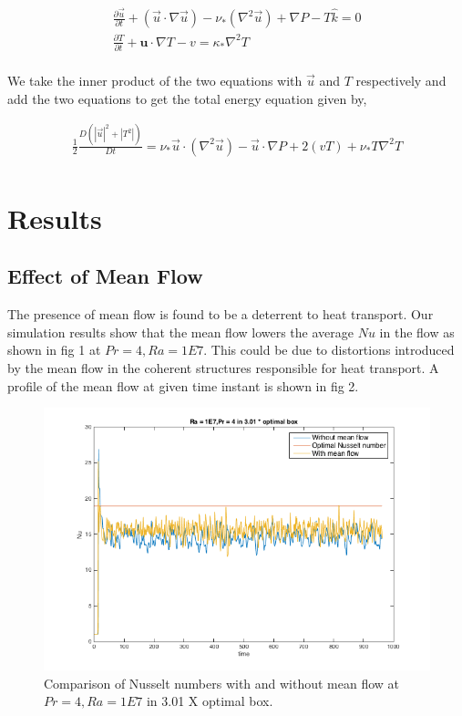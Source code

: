 \documentclass[12pt]{article}
\newcommand{\lapl}{\nabla^{2}}
\newcommand{\lr}[1]{\left(#1\right)}
\begin{document}
    
    \begin{align}
    \frac{\partial \vec{u}}{\partial t} + \lr{\vec{u} \cdot \nabla \vec{u}} - \nu_*\lr{\lapl \vec{u}} + \nabla P - T\hat k = 0 \\
    \frac{\partial T}{\partial t} + \mathbf{u}\cdot\nabla T - v = \kappa_{*}\lapl T \\
    \end{align}
    
    We take the inner product of the two equations with $\vec{u}$ and $T$ respectively and add the two equations to get the total energy equation given by,
    
    \begin{align}
    \frac{1}{2}\frac{D\lr{|\vec{u}|^2 + |{T}^2|}}{D t} = \nu_*\vec u \cdot \lr{\lapl \vec{u}} - \vec u \cdot \nabla P  +  2(vT) + \nu_* T \lapl T\\
    \end{align}
    
     \section{Results}
     \subsection{Effect of Mean Flow}
     The presence of mean flow is found to be a deterrent to heat transport. Our simulation results show that the mean flow lowers the average $Nu$ in the flow as shown in fig 1 at $Pr = 4, Ra = 1E7$. This could be due to distortions introduced by the mean flow in the coherent structures responsible for heat transport. A profile of the mean flow at given time instant is shown in fig 2.
     
     \begin{figure}[!htb]
     	\includegraphics[width=\linewidth]{Nu1E74301opt.png}
     	\caption{Comparison of Nusselt numbers with and without mean flow at $Pr = 4, Ra = 1E7$ in 3.01 X optimal box.}
     	\label{fig:fig1}
     \end{figure}
     
\end{document}
